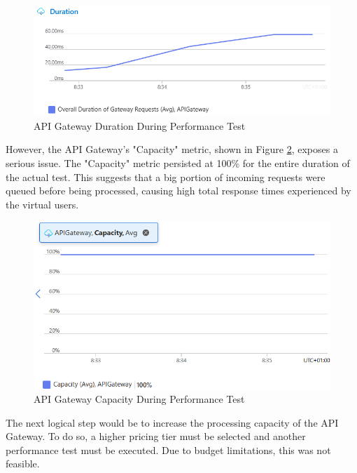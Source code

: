 \documentclass[12pt, reqno]{amsbook}
\theoremstyle{definition}
\theoremstyle{definition}
\numberwithin{section}{chapter}
\numberwithin{table}{chapter}
\numberwithin{figure}{chapter}
\begin{document}
\begin{figure}[H]
  \centering
  \includegraphics[width=1\linewidth]{images/LoadTestingAPIGatewayDuration.png}
  \caption{\label{Figure:LoadTestingAPIGatewayDuration}API Gateway Duration During Performance Test}
\end{figure}

However, the \ac{API} Gateway's "Capacity" metric, shown in Figure \ref{Figure:LoadTestingAPIGatewayCapacity}, exposes a serious issue. The "Capacity" metric persisted at 100\% for the entire duration of the actual test. This suggests that a big portion of incoming requests were queued before being processed, causing high total response times experienced by the virtual users.

\begin{figure}[H]
  \centering
  \includegraphics[width=1\linewidth]{images/LoadTestingAPIGatewayCapacity.png}
  \caption{\label{Figure:LoadTestingAPIGatewayCapacity}API Gateway Capacity During Performance Test}
\end{figure}

The next logical step would be to increase the processing capacity of the \ac{API} Gateway. To do so, a higher pricing tier must be selected and another performance test must be executed. Due to budget limitations, this was not feasible.
\end{document}
